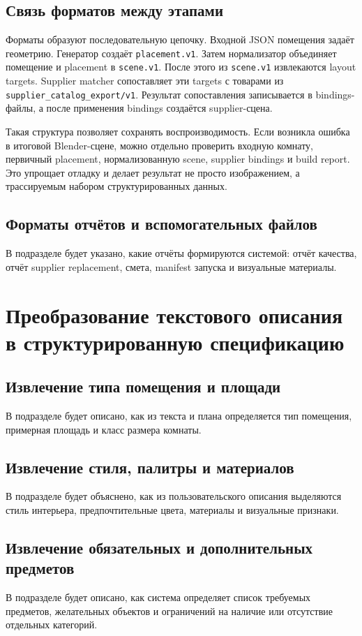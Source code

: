 \documentclass[times]{itmo-student-thesis}
\begin{document}
\subsection{Связь форматов между этапами}

Форматы образуют последовательную цепочку. Входной JSON помещения задаёт геометрию. Генератор создаёт \texttt{placement.v1}. Затем нормализатор объединяет помещение и placement в \texttt{scene.v1}. После этого из \texttt{scene.v1} извлекаются layout targets. Supplier matcher сопоставляет эти targets с товарами из \texttt{supplier\_catalog\_export/v1}. Результат сопоставления записывается в bindings-файлы, а после применения bindings создаётся supplier-сцена.

Такая структура позволяет сохранять воспроизводимость. Если возникла ошибка в итоговой Blender-сцене, можно отдельно проверить входную комнату, первичный placement, нормализованную scene, supplier bindings и build report. Это упрощает отладку и делает результат не просто изображением, а трассируемым набором структурированных данных.

\subsection{Форматы отчётов и вспомогательных файлов}
В подразделе будет указано, какие отчёты формируются системой: отчёт качества, отчёт supplier replacement, смета, manifest запуска и визуальные материалы.

\section{Преобразование текстового описания в структурированную спецификацию}

\subsection{Извлечение типа помещения и площади}
В подразделе будет описано, как из текста и плана определяется тип помещения, примерная площадь и класс размера комнаты.

\subsection{Извлечение стиля, палитры и материалов}
В подразделе будет объяснено, как из пользовательского описания выделяются стиль интерьера, предпочтительные цвета, материалы и визуальные признаки.

\subsection{Извлечение обязательных и дополнительных предметов}
В подразделе будет описано, как система определяет список требуемых предметов, желательных объектов и ограничений на наличие или отсутствие отдельных категорий.
\end{document}
